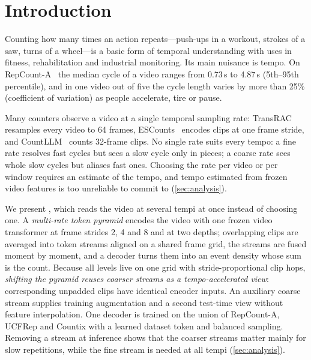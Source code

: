 \section{Introduction}
\label{sec:intro}

Counting how many times an action repeats---push-ups in a workout, strokes of a
saw, turns of a wheel---is a basic form of temporal understanding with uses in
fitness, rehabilitation and industrial monitoring. Its main nuisance is tempo. On
RepCount-A~\cite{hu2022transrac} the median cycle of a video ranges from 0.73\,s to
4.87\,s (5th--95th percentile), and in one video out of five the cycle length
varies by more than 25\% (coefficient of variation) as people accelerate, tire or
pause.

Many counters observe a video at a single temporal sampling rate: TransRAC
resamples every video to 64 frames, ESCounts~\cite{sinha2024escounts} encodes
clips at one frame stride, and CountLLM~\cite{yao2025countllm} counts 32-frame
clips. No single rate suits every tempo: a fine rate resolves fast
cycles but sees a slow cycle only in pieces; a coarse rate sees whole slow cycles
but aliases fast ones. Choosing the rate per video or per window requires an
estimate of the tempo, and tempo estimated from frozen video features is too
unreliable to commit to (\cref{sec:analysis}).

We present \method, which reads the video at several tempi at once instead of
choosing one. A \emph{multi-rate token pyramid} encodes the video with one frozen
video transformer at frame strides 2, 4 and 8 and at two depths; overlapping clips
are averaged into token streams aligned on a shared frame grid, the streams are
fused moment by moment, and a decoder turns them into an event density whose sum
is the count. Because all levels live on one grid with stride-proportional clip
hops, \emph{shifting the pyramid reuses coarser streams as a tempo-accelerated
view}: corresponding unpadded clips have identical encoder inputs. An auxiliary
coarse stream supplies training augmentation and a second test-time view without
feature interpolation. One decoder
is trained on the union of RepCount-A, UCFRep and Countix with a learned dataset
token and balanced sampling. Removing a stream at inference shows that the
coarser streams matter mainly for slow repetitions, while the fine stream is
needed at all tempi (\cref{sec:analysis}).

